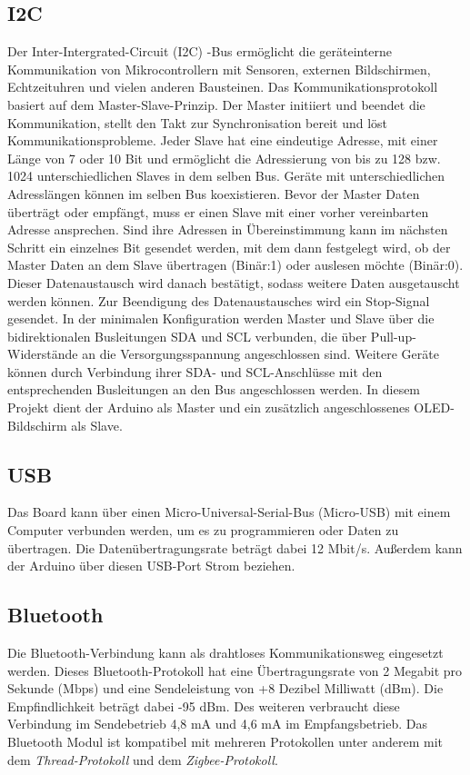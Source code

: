 \subsection{I2C}
Der Inter-Intergrated-Circuit (I2C) -Bus ermöglicht die geräteinterne Kommunikation von Mikrocontrollern mit Sensoren, externen Bildschirmen, Echtzeituhren und vielen anderen Bausteinen. Das Kommunikationsprotokoll basiert auf dem Master-Slave-Prinzip. Der Master initiiert und beendet die Kommunikation, stellt den Takt zur Synchronisation bereit und löst Kommunikationsprobleme. Jeder Slave hat eine eindeutige Adresse, mit einer Länge von 7 oder 10 Bit und ermöglicht die Adressierung von bis zu 128 bzw. 1024 unterschiedlichen Slaves in dem selben Bus. Geräte mit unterschiedlichen Adresslängen können im selben Bus koexistieren. Bevor der Master Daten überträgt oder empfängt, muss er einen Slave mit einer vorher vereinbarten Adresse ansprechen.\cite{Meroth.2021}\cite{STM1.2015}\cite{Bernstein.2020} Sind ihre Adressen in Übereinstimmung kann im nächsten Schritt ein einzelnes Bit gesendet werden, mit dem dann festgelegt wird, ob der Master Daten an dem Slave übertragen (Binär:1) oder auslesen möchte (Binär:0). Dieser Datenaustausch wird danach bestätigt, sodass weitere Daten ausgetauscht werden können. Zur Beendigung des Datenaustausches wird ein Stop-Signal gesendet.\cite{Gehrke.2022} In der minimalen Konfiguration werden Master und Slave über die bidirektionalen Busleitungen SDA und SCL verbunden, die über Pull-up-Widerstände an die Versorgungsspannung angeschlossen sind. Weitere Geräte können durch Verbindung ihrer SDA- und SCL-Anschlüsse mit den entsprechenden Busleitungen an den Bus angeschlossen werden.\cite{Meroth.2021} In diesem Projekt dient der Arduino als Master und ein zusätzlich angeschlossenes OLED-Bildschirm als Slave.

\subsection{USB}
Das Board kann über einen Micro-Universal-Serial-Bus (Micro-USB) mit einem Computer verbunden werden, um es zu programmieren oder Daten zu übertragen. Die Datenübertragungsrate beträgt dabei 12 Mbit/s. Außerdem kann der Arduino über diesen USB-Port Strom beziehen.

\subsection{Bluetooth}
Die Bluetooth-Verbindung kann als drahtloses Kommunikationsweg eingesetzt werden. Dieses Bluetooth-Protokoll hat eine Übertragungsrate von 2 Megabit pro Sekunde (Mbps) und eine Sendeleistung von +8 Dezibel Milliwatt (dBm). Die Empfindlichkeit beträgt dabei -95 dBm. Des weiteren verbraucht diese Verbindung im Sendebetrieb 4,8 mA und 4,6 mA im Empfangsbetrieb. Das Bluetooth Modul ist kompatibel mit mehreren Protokollen unter anderem mit dem \textit{Thread-Protokoll} und dem \textit{Zigbee-Protokoll}.\cite{Ard.2024} \cite{NrdSem4.2024}

